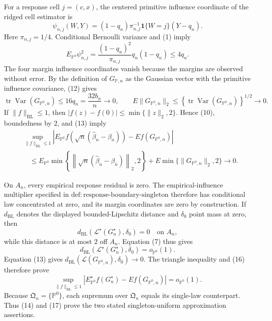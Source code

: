 For a response cell \(j=(c,x)\), the centered primitive influence coordinate of the ridged cell estimator is
\[
\psi_{n,j}(W,Y)
=(1-q_n)\pi_{n,j}^{-1}\mathbf 1\{W=j\}(Y-q_n).
\tag{11}
\]
Here \(\pi_{n,j}=1/4\).  Conditional Bernoulli variance and (1) imply
\[
E_{\mathbb P^0}\psi_{n,j}^2
=\frac{(1-q_n)^2}{\pi_{n,j}}q_n(1-q_n)
\leq4q_n.
\tag{12}
\]
The four margin influence coordinates vanish because the margins are observed without error.  By the definition of \(G_{\mathbb P,n}\) as the Gaussian vector with the primitive influence covariance, (12) gives
\[
\operatorname{tr}\operatorname{Var}(G_{\mathbb P^0,n})
\leq16q_n=\frac{32b_n}{n}\longrightarrow0,
\qquad
E\lVert G_{\mathbb P^0,n}\rVert_2
\leq\left\{\operatorname{tr}\operatorname{Var}(G_{\mathbb P^0,n})\right\}^{1/2}
\longrightarrow0.
\tag{13}
\]
If \(\lVert f\rVert_{\mathrm{BL}}\leq1\), then \(|f(z)-f(0)|\leq\min\{\lVert z\rVert_2,2\}\).  Hence (10), boundedness by \(2\), and (13) imply
\[
\begin{split}
&\sup_{\lVert f\rVert_{\mathrm{BL}}\leq1}
\left|
E_{\mathbb P^0}f\!\left(\sqrt n(\widehat\beta_n-\beta_n)\right)
-Ef(G_{\mathbb P^0,n})
\right|\\
&\quad\leq
E_{\mathbb P^0}\min\!\left\{
\left\lVert\sqrt n(\widehat\beta_n-\beta_n)\right\rVert_2,2
\right\}
+E\min\{\lVert G_{\mathbb P^0,n}\rVert_2,2\}
\longrightarrow0.
\end{split}
\tag{14}
\]

On \(A_n\), every empirical response residual is zero.  The empirical-influence multiplier specified in \(\mathrm{def:response\text{-}boundary\text{-}singleton}\) therefore has conditional law concentrated at zero, and its margin coordinates are zero by construction.  If \(d_{\mathrm{BL}}\) denotes the displayed bounded-Lipschitz distance and \(\delta_0\) point mass at zero, then
\[
d_{\mathrm{BL}}\!\left(\mathcal L^\star(G_n^\star),\delta_0\right)=0
\quad\text{on }A_n,
\tag{15}
\]
while this distance is at most \(2\) off \(A_n\).  Equation (7) thus gives
\[
d_{\mathrm{BL}}\!\left(\mathcal L^\star(G_n^\star),\delta_0\right)
=o_{\mathbb P^0}(1).
\tag{16}
\]
Equation (13) gives \(d_{\mathrm{BL}}(\mathcal L(G_{\mathbb P^0,n}),\delta_0)\to0\).  The triangle inequality and (16) therefore prove
\[
\sup_{\lVert f\rVert_{\mathrm{BL}}\leq1}
\left|E_{\mathbb P^0}^{\star}f(G_n^\star)-Ef(G_{\mathbb P^0,n})\right|
=o_{\mathbb P^0}(1).
\tag{17}
\]
Because \(\mathfrak Q_{\kappa}=\{\mathbb P^0\}\), each supremum over \(\mathfrak Q_{\kappa}\) equals its single-law counterpart.  Thus (14) and (17) prove the two stated singleton-uniform approximation assertions.

